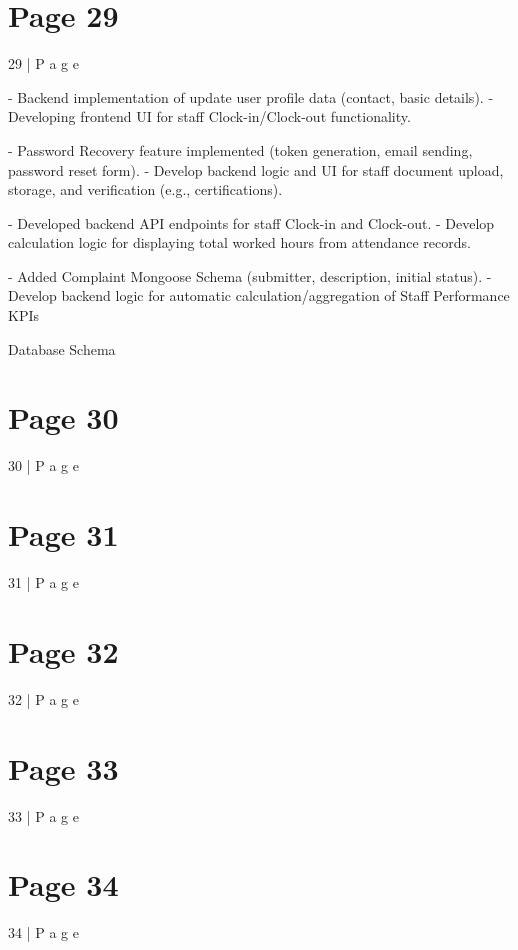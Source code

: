 \documentclass{article}
\begin{document}
\section*{Page 29}
29 | P a g e 
 
- Backend implementation 
of update user profile data 
(contact, basic details). 
- Developing frontend UI for 
staff Clock-in/Clock-out 
functionality. 
 
- Password Recovery 
feature implemented (token 
generation, email sending, 
password reset form). 
- Develop backend logic 
and UI for staff document 
upload, storage, and 
verification (e.g., 
certifications). 
 
- Developed backend API 
endpoints for staff Clock-in 
and Clock-out. 
- Develop calculation logic 
for displaying total worked 
hours from attendance 
records. 
 
- Added Complaint 
Mongoose Schema 
(submitter, description, 
initial status). 
- Develop backend logic for 
automatic 
calculation/aggregation of 
Staff Performance KPIs 
 
 
 
 
Database Schema 
 

\section*{Page 30}
30 | P a g e 
 
 
 
 
 
 
 
 
 
 


\section*{Page 31}
31 | P a g e 
 
 


\section*{Page 32}
32 | P a g e 
 
 


\section*{Page 33}
33 | P a g e 
 
 


\section*{Page 34}
34 | P a g e 
 
\end{document}
